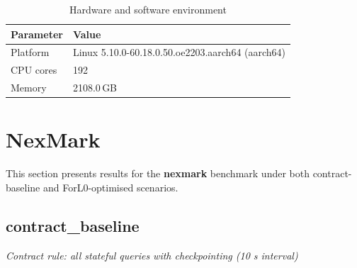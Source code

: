 \documentclass[11pt,a4paper]{article}
\begin{document}
\begin{table}[h]
\centering
\caption{Hardware and software environment}
\begin{tabular}{ll}
\toprule
\textbf{Parameter} & \textbf{Value} \\
\midrule
Platform & Linux 5.10.0-60.18.0.50.oe2203.aarch64 (aarch64) \\
CPU cores & 192 \\
Memory & 2108.0\,GB \\
\bottomrule
\end{tabular}
\end{table}


\section{NexMark}

This section presents results for the \textbf{nexmark} benchmark under both contract-baseline and ForL0-optimised scenarios.


\subsection{contract\_baseline}

\textit{Contract rule: all stateful queries with checkpointing (10 s interval)}
\end{document}
